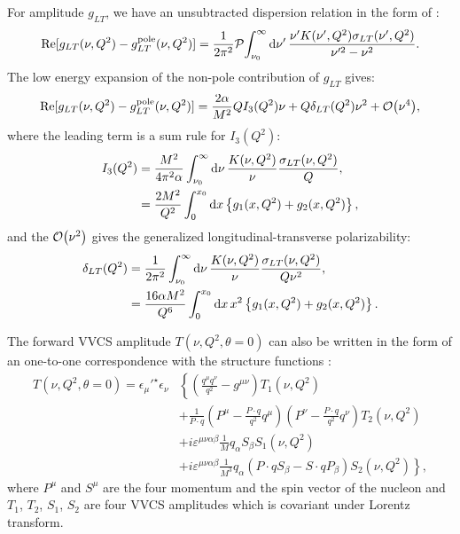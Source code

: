 For amplitude $g_{LT}$, we have an unsubtracted dispersion relation in the form of \cite{Drechsel2003}:
\begin{equation} \label{C4S2E9}
\Re[g_{LT}(\nu,Q^2)-g_{LT}^{\mathrm{pole}}(\nu,Q^2)] = \frac{1}{2\pi^2}\pv{\int_{\nu_0}^\infty\dd{\nu'}\frac{\nu'K(\nu',Q^2)\slt(\nu',Q^2)}{\nu'^2-\nu^2}}.
\end{equation}
The low energy expansion of the non-pole contribution of $g_{LT}$ gives:
\begin{equation} \label{C4S2E10}
\Re[g_{LT}(\nu,Q^2)-g_{LT}^{\mathrm{pole}}(\nu,Q^2)] = \frac{2\alpha}{M^2}QI_3(Q^2)\nu+Q\dlt(Q^2)\nu^2+\order{\nu^4},
\end{equation}
where the leading term is a sum rule for $I_3(Q^2)$:
\begin{equation} \label{C4S2E11}
\begin{split}
I_3(Q^2) & = \frac{M^2}{4\pi^2\alpha}\int_{\nu_0}^\infty\dd{\nu}\frac{K(\nu,Q^2)}{\nu}\frac{\sigma_{LT}(\nu,Q^2)}{Q}, \\
& = \frac{2M^2}{Q^2}\int_0^{x_0}\dd{x}\left\{g_1(x,Q^2)+g_2(x,Q^2)\right\},
\end{split}
\end{equation}
and the $\order{\nu^2}$ gives the generalized longitudinal-transverse polarizability:
\begin{equation} \label{C4S2E12}
\begin{split}
\delta_{LT}(Q^2) & = \frac{1}{2\pi^2}\int_{\nu_0}^\infty\dd{\nu}\frac{K(\nu,Q^2)}{\nu}\frac{\sigma_{LT}(\nu,Q^2)}{Q\nu^2}, \\
& = \frac{16\alpha M^2}{Q^6}\int_0^{x_0}\dd{x}x^2\left\{g_1(x,Q^2)+g_2(x,Q^2)\right\}.
\end{split}
\end{equation}

The forward VVCS amplitude $T(\nu,Q^2,\theta=0)$ can also be written in the form of an one-to-one correspondence with the structure functions \cite{Drechsel2003}:
\begin{equation} \label{C4S2E13}
\begin{split}
T(\nu,Q^2,\theta=0) = \epsilon_\mu'^{\star}\epsilon_\nu & \left\{\left(\frac{q^\mu q^\nu}{q^2}-g^{\mu\nu}\right)T_1(\nu,Q^2)\right. \\
& +\frac{1}{P\cdot q}(P^\mu-\frac{P\cdot q}{q^2}q^\mu)(P^\nu-\frac{P\cdot q}{q^2}q^\nu)T_2(\nu,Q^2) \\
& +i\varepsilon^{\mu\nu\alpha\beta}\frac{1}{M}q_\alpha S_\beta S_1(\nu,Q^2) \\
& \left.+i\varepsilon^{\mu\nu\alpha\beta}\frac{1}{M^3}q_\alpha(P\cdot qS_\beta-S\cdot qP_\beta)S_2(\nu,Q^2)\right\},
\end{split}
\end{equation}
where $P^\mu$ and $S^\mu$ are the four momentum and the spin vector of the nucleon and $T_1$, $T_2$, $S_1$, $S_2$ are four VVCS amplitudes which is covariant under Lorentz transform.

